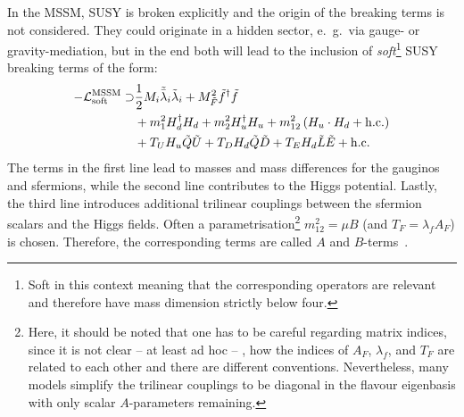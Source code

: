 \noindent In the MSSM, SUSY is broken explicitly and the origin of the breaking terms is not considered. They could originate in a hidden sector, e.\ g.\ via gauge- or gravity-mediation, but in the end both will lead to the inclusion of \textit{soft}\footnote{Soft in this context meaning that the corresponding operators are relevant and therefore have mass dimension strictly below four.} SUSY breaking terms of the form:
\begin{align}\nonumber
  -\mathcal{L}^\mathrm{MSSM}_\mathrm{soft}\supset&\frac12M_i\tilde{\bar{\lambda}}_i\tilde{\lambda}_i+M^2_{\tilde{F}}\tilde{f}^\dagger\tilde{f}\\
  &+m_1^2H_d^\dagger H_d+m_2^2H_u^\dagger H_u+m_{12}^2\left(H_u\cdot H_d+\mathrm{h. c.}\right)\\\nonumber
  &+T_UH_u\tilde{Q}\tilde{U}+T_DH_d\tilde{Q}\tilde{D}+T_EH_d\tilde{L}\tilde{E}+\mathrm{h. c.}
\end{align}
The terms in the first line lead to masses and mass differences for the gauginos and sfermions, while the second line contributes to the Higgs potential. Lastly, the third line introduces additional trilinear couplings between the sfermion scalars and the Higgs fields.
Often a parametrisation\footnote{Here, it should be noted that one has to be careful regarding matrix indices, since it is not clear – at least ad hoc – , how the indices of $A_F$, $\lambda_f$, and $T_F$ are related to each other and there are different conventions. Nevertheless, many models simplify the trilinear couplings to be diagonal in the flavour eigenbasis with only scalar $A$-parameters remaining.} $m_{12}^2=\mu B$ (and $T_F=\lambda_f A_F$) is chosen. Therefore, the corresponding terms are called $A$ and $B$-terms~\cite{pdg, arthur, chung, peskin}.

